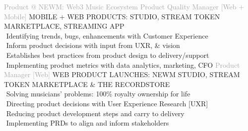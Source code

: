     
\begin{cvtable}
    {\textcolor{darkgray} {Product \newline @ NEWM: Web3 Music Ecosystem } }
    { }{{ {    } }}
%
    {\textcolor{darkgray}
    {
    Product Quality Manager [Web + Mobile] %
    }
    }
    { }%
    {
    {
    {\scriptsize
    MOBILE +
    WEB
    PRODUCTS: STUDIO, STREAM TOKEN MARKETPLACE, STREAMING APP
    } \\
     \textperiodcentered $ $ Identifying trends, bugs, enhancements with Customer Experience \\
     \textperiodcentered $ $ Inform product decisions with input from UXR, \& vision \\
     \textperiodcentered $ $ Establishes best practices from product design to delivery/support \\
     \textperiodcentered $ $ Implementing product metrics with data analytics, marketing, CFO
    }}
%
%
    {\textcolor{darkgray}{
    Product 
    Manager
    [Web]
    }}%
    {
    }%
    {%
    {\scriptsize
    WEB
    PRODUCT
    LAUNCHES: NEWM STUDIO, STREAM TOKEN MARKETPLACE \& THE RECORDSTORE} \\
     \textperiodcentered $ $ Solving musicians' problems: 100\% royalty ownership for life \\
     \textperiodcentered $ $ Directing product decisions with User Experience Research [UXR] \\
    \textperiodcentered $ $ Reducing product development steps and carry to delivery \\
    \textperiodcentered $ $ Implementing PRDs to align and inform stakeholders \\
}
\end{cvtable}
